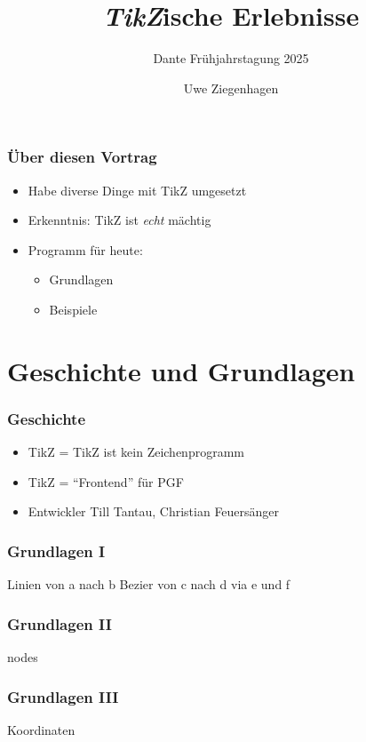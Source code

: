 \documentclass[14pt,ngerman]{beamer}
\author{Uwe Ziegenhagen}
\title{\textit{TikZ}ische Erlebnisse}
\subtitle{Dante Frühjahrstagung 2025}
\begin{document}
\begin{frame}

\maketitle

\end{frame}

\begin{frame}
\frametitle{Über diesen Vortrag}

\begin{itemize}
\item Habe diverse Dinge mit TikZ umgesetzt
\item Erkenntnis: TikZ ist \textit{echt} mächtig 
\item Programm für heute: 
\begin{itemize}
	\item Grundlagen
	\item Beispiele
\end{itemize}

\end{itemize}
\end{frame}

\section{Geschichte und Grundlagen} 

\begin{frame}
\frametitle{Geschichte}

\begin{itemize}
\item TikZ = TikZ ist kein Zeichenprogramm
\item TikZ = \enquote{Frontend} für PGF
\item Entwickler Till Tantau, Christian Feuersänger
\end{itemize}
\end{frame}



\begin{frame}
\frametitle{Grundlagen I}

Linien von a nach b
Bezier von c nach d via e und f

\end{frame}


\begin{frame}
\frametitle{Grundlagen II}

nodes

\end{frame}

\begin{frame}
\frametitle{Grundlagen III}

Koordinaten

\end{frame}
\end{document}

